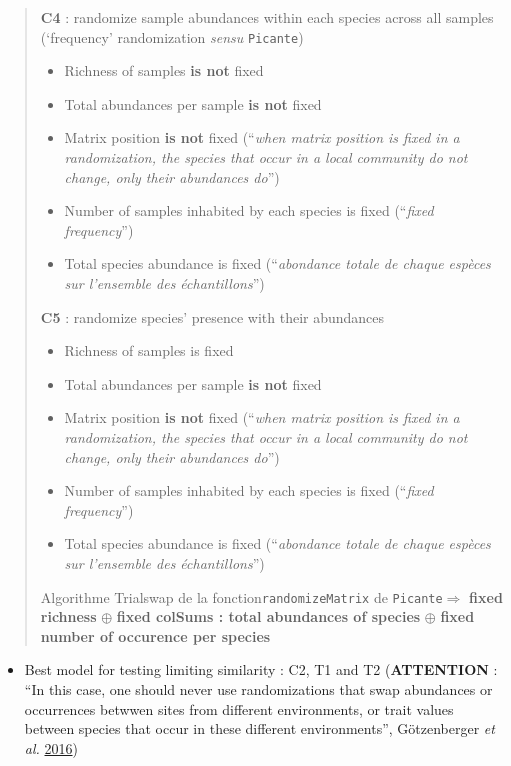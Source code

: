 \documentclass[]{article}
\providecommand{\tightlist}{%
  \setlength{\itemsep}{0pt}\setlength{\parskip}{0pt}}
\begin{document}
\begin{quote}
\textbf{C4} : randomize sample abundances within each species across all
samples (`frequency' randomization \emph{sensu} \texttt{Picante})

\begin{itemize}
\tightlist
\item
  Richness of samples \textbf{is not} fixed
\item
  Total abundances per sample \textbf{is not} fixed
\item
  Matrix position \textbf{is not} fixed (``\emph{when matrix position is
  fixed in a randomization, the species that occur in a local community
  do not change, only their abundances do}'')
\item
  Number of samples inhabited by each species is fixed (``\emph{fixed
  frequency}'')
\item
  Total species abundance is fixed (``\emph{abondance totale de chaque
  espèces sur l'ensemble des échantillons}'')
\end{itemize}

\textbf{C5} : randomize species' presence with their abundances

\begin{itemize}
\tightlist
\item
  Richness of samples is fixed
\item
  Total abundances per sample \textbf{is not} fixed
\item
  Matrix position \textbf{is not} fixed (``\emph{when matrix position is
  fixed in a randomization, the species that occur in a local community
  do not change, only their abundances do}'')
\item
  Number of samples inhabited by each species is fixed (``\emph{fixed
  frequency}'')
\item
  Total species abundance is fixed (``\emph{abondance totale de chaque
  espèces sur l'ensemble des échantillons}'')
\end{itemize}

Algorithme Trialswap de la fonction\texttt{randomizeMatrix} de
\texttt{Picante}\(\Rightarrow\) \textbf{fixed richness} \(\oplus\)
\textbf{fixed colSums : total abundances of species} \(\oplus\)
\textbf{fixed number of occurence per species}
\end{quote}

\begin{itemize}
\tightlist
\item
  Best model for testing limiting similarity : C2, T1 and T2
  (\textbf{ATTENTION} : ``In this case, one should never use
  randomizations that swap abundances or occurrences betwwen sites from
  different environments, or trait values between species that occur in
  these different environments'', Götzenberger \emph{et al.}
  \protect\hyperlink{ref-gotzenberger2016randomizations}{2016})
\end{itemize}
\end{document}
